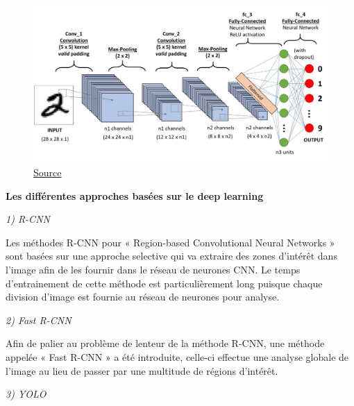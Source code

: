 \documentclass[a4paper,12pt]{article} %
\begin{document}
\begin{figure}[h] %
  \centering %
  \includegraphics[scale=0.20]{CNN.jpeg} %
  \caption{\href{https://towardsdatascience.com/a-comprehensive-guide-to-convolutional-neural-networks-the-eli5-way-3bd2b1164a53}{Source} }
\end{figure}
\newpage
\textbf{Les différentes approches basées sur le deep learning}\newline

\textit{1)	R-CNN}\newline

Les méthodes R-CNN pour « Region-based Convolutional Neural Networks » sont basées sur une approche selective qui va extraire des zones d’intérêt dans l’image afin de les fournir dans le réseau de neurones CNN. Le temps d’entrainement de cette méthode est particulièrement long puisque chaque division d’image est fournie au réseau de neurones pour analyse.\newline 

\textit{2)	Fast R-CNN}\newline

Afin de palier au problème de lenteur de la méthode R-CNN, une méthode appelée « Fast R-CNN » a été introduite, celle-ci effectue une analyse globale de l’image au lieu de passer par une multitude de régions d’intérêt.\newline

\textit{3)	YOLO}\newline 
\end{document}
